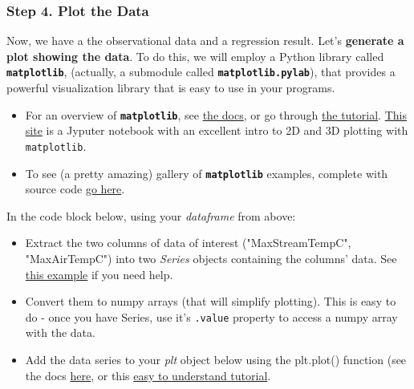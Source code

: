 \documentclass[11pt]{article}
\begin{document}
    \subsubsection{Step 4. Plot the Data}\label{step-4.-plot-the-data}

Now, we have a the observational data and a regression result. Let's
\textbf{generate a plot showing the data}. To do this, we will employ a
Python library called \textbf{\texttt{matplotlib}}, (actually, a
submodule called \textbf{\texttt{matplotlib.pylab}}), that provides a
powerful visualization library that is easy to use in your programs.

\begin{itemize}
\item
  For an overview of \textbf{\texttt{matplotlib}}, see
  \href{https://matplotlib.org/index.html}{the docs}, or go through
  \href{https://matplotlib.org/users/pyplot_tutorial.html}{the
  tutorial}.
  \href{https://github.com/jrjohansson/scientific-python-lectures/blob/master/Lecture-4-Matplotlib.ipynb}{This
  site} is a Jyputer notebook with an excellent intro to 2D and 3D
  plotting with \texttt{matplotlib}.
\item
  To see (a pretty amazing) gallery of \textbf{\texttt{matplotlib}}
  examples, complete with source code
  \href{https://matplotlib.org/gallery.html}{go here}.
\end{itemize}

In the code block below, using your \emph{dataframe} from above:

\begin{itemize}
\item
  Extract the two columns of data of interest ("MaxStreamTempC",
  "MaxAirTempC") into two \emph{Series} objects containing the columns'
  data. See
  \href{http://www.datacarpentry.org/python-ecology-lesson/02-index-slice-subset/}{this
  example} if you need help.
\item
  Convert them to numpy arrays (that will simplify plotting). This is
  easy to do - once you have Series, use it's \texttt{.value} property
  to access a numpy array with the data.
\item
  Add the data series to your \emph{plt} object below using the
  plt.plot() function (see the docs
  \href{https://matplotlib.org/api/pyplot_api.html?highlight=plot\#matplotlib.pyplot.plot}{here},
  or this
  \href{https://www.datacamp.com/community/tutorials/matplotlib-tutorial-python}{easy
  to understand tutorial}.
\end{itemize}
\end{document}
